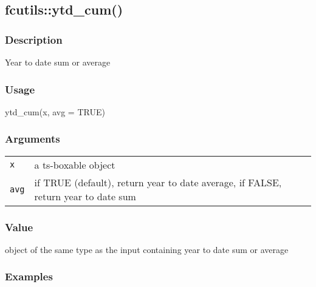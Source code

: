 \documentclass[
  letterpaper,
  DIV=11,
  numbers=noendperiod]{scrreport}
\newenvironment{Shaded}{\begin{snugshade}}{\end{snugshade}}
\newcommand{\AttributeTok}[1]{\textcolor[rgb]{0.40,0.45,0.13}{#1}}
\newcommand{\ConstantTok}[1]{\textcolor[rgb]{0.56,0.35,0.01}{#1}}
\newcommand{\FunctionTok}[1]{\textcolor[rgb]{0.28,0.35,0.67}{#1}}
\newcommand{\NormalTok}[1]{\textcolor[rgb]{0.00,0.23,0.31}{#1}}
\begin{document}
\subsection{fcutils::ytd\_cum()}\label{fcutilsytd_cum}

\subsubsection{Description}\label{description-41}

Year to date sum or average

\subsubsection{Usage}\label{usage-41}

\begin{Shaded}
\begin{Highlighting}[]
\FunctionTok{ytd\_cum}\NormalTok{(x, }\AttributeTok{avg =} \ConstantTok{TRUE}\NormalTok{)}
\end{Highlighting}
\end{Shaded}

\subsubsection{Arguments}\label{arguments-41}

\begin{longtable}[]{@{}ll@{}}
\toprule\noalign{}
\endhead
\bottomrule\noalign{}
\endlastfoot
\texttt{x} & a ts-boxable object \\
\texttt{avg} & if TRUE (default), return year to date average, if FALSE,
return year to date sum \\
\end{longtable}

\subsubsection{Value}\label{value-41}

object of the same type as the input containing year to date sum or
average

\subsubsection{Examples}\label{examples-41}
\end{document}
